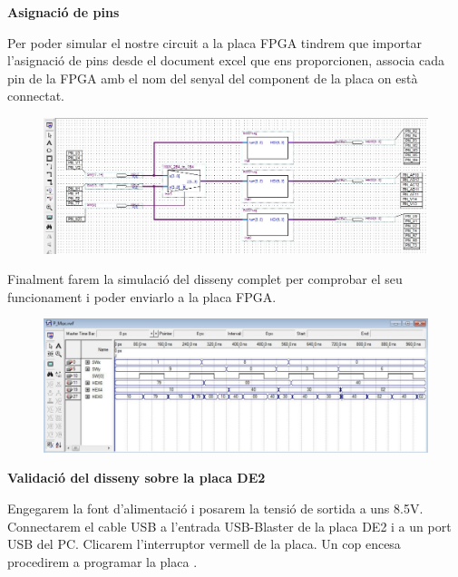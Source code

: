 \documentclass[12pt, a4papre]{article}
\begin{document}
	
	\textbf{\large{Asignació de pins}}	
	
	Per poder simular el nostre circuit a la placa FPGA tindrem que importar l'asignació de pins desde el document excel que ens proporcionen, associa cada pin de la FPGA amb el nom del senyal del component de la placa on està connectat. 
	\begin{figure}[H]
		\begin{center}
		\includegraphics[width=150mm]{bcd7segasign.jpeg}
		\end{center}
	\end{figure}
	
	Finalment farem la simulació del disseny complet per comprobar el seu funcionament i poder enviarlo a la placa FPGA.
	\begin{figure}[H]
		\begin{center}
		\includegraphics[width=150mm]{simulfinal.jpeg}
		\end{center}
	\end{figure}
	
	
	\textbf{\large{Validació del disseny sobre la placa DE2}}	
	
	Engegarem la font d’alimentació i posarem la tensió de sortida a uns 8.5V. Connectarem el cable
	USB a l’entrada USB-Blaster de la placa DE2 i a un port USB del PC.  Clicarem l’interruptor vermell de la placa.
	Un cop encesa  procedirem a programar la placa .
	
\end{document}
